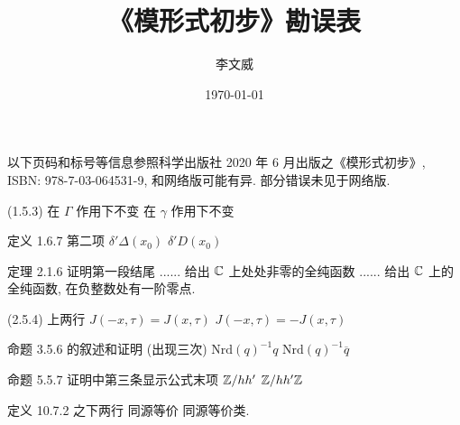 \documentclass{AJerrata}
\title{\bfseries 《模形式初步》勘误表}
\author{李文威}
\date{\today}
\begin{document}
	\maketitle
	以下页码和标号等信息参照科学出版社 2020 年 6 月出版之《模形式初步》, ISBN: 978-7-03-064531-9, 和网络版可能有异. 部分错误未见于网络版.
	
	\begin{Errata}
		\item[(1.5.3)]
		\Orig 在 $\Gamma$ 作用下不变
		\Corr 在 $\gamma$ 作用下不变
		
		\item[定义 1.6.7 第二项]
		\Orig $\delta' \Delta(x_0)$
		\Corr $\delta' D(x_0)$
		
		\item[定理 2.1.6 证明第一段结尾]
		\Orig ...... 给出 $\mathbb{C}$ 上处处非零的全纯函数
		\Corr ...... 给出 $\mathbb{C}$ 上的全纯函数, 在负整数处有一阶零点. 

		\item[(2.5.4) 上两行]
		\Orig $J(-x, \tau) = J(x, \tau)$
		\Corr $J(-x, \tau) = -J(x, \tau)$
		
		\item[命题 3.5.6 的叙述和证明 (出现三次)]
		\Orig $\mathrm{Nrd}(q)^{-1} q$
		\Corr $\mathrm{Nrd}(q)^{-1} \overline{q}$ 
		
		\item[命题 5.5.7 证明中第三条显示公式末项]
		\Orig $\mathbb{Z}/hh'$
		\Corr $\mathbb{Z}/hh' \mathbb{Z}$
		
		\item[定义 10.7.2 之下两行]
		\Orig 同源等价
		\Corr 同源等价类.
	\end{Errata}
\end{document}
